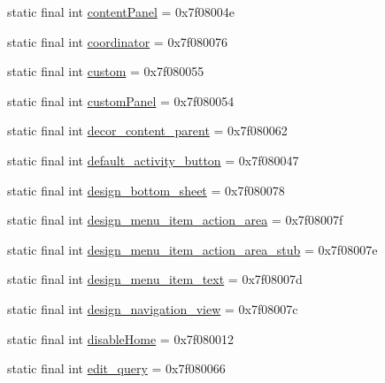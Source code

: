 \begin{CompactItemize}
\item 
static final int \hyperlink{classandroid_1_1support_1_1v7_1_1palette_1_1_r_1_1id_49f0cf5c29aa696cdb2c7013de23ac01}{contentPanel} = 0x7f08004e
\item 
static final int \hyperlink{classandroid_1_1support_1_1v7_1_1palette_1_1_r_1_1id_cdbcc2e7cd0f41b11d656acb3b778bca}{coordinator} = 0x7f080076
\item 
static final int \hyperlink{classandroid_1_1support_1_1v7_1_1palette_1_1_r_1_1id_f9ace5018e608cc5dbf5a73f6f1b20a4}{custom} = 0x7f080055
\item 
static final int \hyperlink{classandroid_1_1support_1_1v7_1_1palette_1_1_r_1_1id_a5f6a31cd34a7538bb68d38477f9a94a}{customPanel} = 0x7f080054
\item 
static final int \hyperlink{classandroid_1_1support_1_1v7_1_1palette_1_1_r_1_1id_c3b393d7213d4e04bf44ea12f56175af}{decor\_\-content\_\-parent} = 0x7f080062
\item 
static final int \hyperlink{classandroid_1_1support_1_1v7_1_1palette_1_1_r_1_1id_89b66fa46037d97127061eba497a5749}{default\_\-activity\_\-button} = 0x7f080047
\item 
static final int \hyperlink{classandroid_1_1support_1_1v7_1_1palette_1_1_r_1_1id_308ac4a35a7e48fc909830cd4e1aa4db}{design\_\-bottom\_\-sheet} = 0x7f080078
\item 
static final int \hyperlink{classandroid_1_1support_1_1v7_1_1palette_1_1_r_1_1id_a7bfed081b0f16f96c505070ba1168c1}{design\_\-menu\_\-item\_\-action\_\-area} = 0x7f08007f
\item 
static final int \hyperlink{classandroid_1_1support_1_1v7_1_1palette_1_1_r_1_1id_ce232c0eeb3a2651596359fae817e7b7}{design\_\-menu\_\-item\_\-action\_\-area\_\-stub} = 0x7f08007e
\item 
static final int \hyperlink{classandroid_1_1support_1_1v7_1_1palette_1_1_r_1_1id_e24217024a89f093f7a1550a044efcdf}{design\_\-menu\_\-item\_\-text} = 0x7f08007d
\item 
static final int \hyperlink{classandroid_1_1support_1_1v7_1_1palette_1_1_r_1_1id_738d09c16302b1f5678e1699a29bf424}{design\_\-navigation\_\-view} = 0x7f08007c
\item 
static final int \hyperlink{classandroid_1_1support_1_1v7_1_1palette_1_1_r_1_1id_11bb1d7160e9dae5497003c2e6293954}{disableHome} = 0x7f080012
\item 
static final int \hyperlink{classandroid_1_1support_1_1v7_1_1palette_1_1_r_1_1id_22637a86251643bac273e7401ede3ee4}{edit\_\-query} = 0x7f080066
\item 

\end{CompactItemize}
